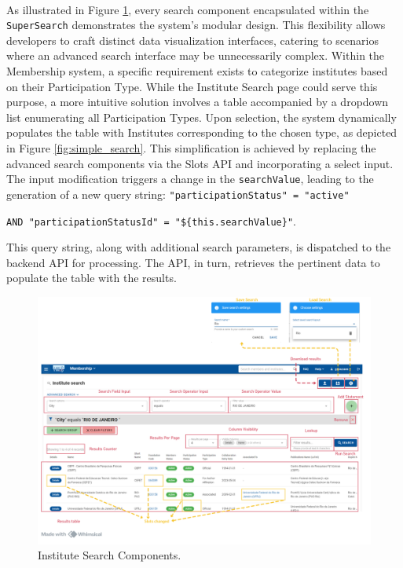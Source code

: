 \paragraph{} As illustrated in Figure \ref{fig:search_components}, every search component encapsulated within the \verb|SuperSearch| demonstrates the system's modular design. This flexibility allows developers to craft distinct data visualization interfaces, catering to scenarios where an advanced search interface may be unnecessarily complex. Within the Membership system, a specific requirement exists to categorize institutes based on their Participation Type. While the Institute Search page could serve this purpose, a more intuitive solution involves a table accompanied by a dropdown list enumerating all Participation Types. Upon selection, the system dynamically populates the table with Institutes corresponding to the chosen type, as depicted in Figure \ref{fig:simple_search}. This simplification is achieved by replacing the advanced search components via the Slots API and incorporating a select input. The input modification triggers a change in the \verb|searchValue|, leading to the generation of a new query string: 
\verb|"participationStatus" = "active"|

\verb|AND "participationStatusId" = "${this.searchValue}"|. 

\noindent
This query string, along with additional search parameters, is dispatched to the backend API for processing. The API, in turn, retrieves the pertinent data to populate the table with the results.

\begin{figure}[H]
    \centering
    \includegraphics[width=1.0\linewidth]{figuras/search_components_marked.png}
    \caption{Institute Search Components.}
    \label{fig:search_components}
\end{figure}


